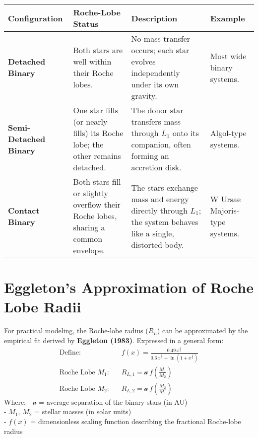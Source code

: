 \documentclass[
  letterpaper,
]{book}
\begin{document}
\begin{longtable}[]{@{}
  >{\raggedright\arraybackslash}p{}
  >{\raggedright\arraybackslash}p{}
  >{\raggedright\arraybackslash}p{}
  >{\raggedright\arraybackslash}p{}@{}}
\toprule\noalign{}
\begin{minipage}[b]{\linewidth}\raggedright
Configuration
\end{minipage} & \begin{minipage}[b]{\linewidth}\raggedright
Roche-Lobe Status
\end{minipage} & \begin{minipage}[b]{\linewidth}\raggedright
Description
\end{minipage} & \begin{minipage}[b]{\linewidth}\raggedright
Example
\end{minipage} \\
\midrule\noalign{}
\endhead
\bottomrule\noalign{}
\endlastfoot
\textbf{Detached Binary} & Both stars are well within their Roche lobes.
& No mass transfer occurs; each star evolves independently under its own
gravity. & Most wide binary systems. \\
\textbf{Semi-Detached Binary} & One star fills (or nearly fills) its
Roche lobe; the other remains detached. & The donor star transfers mass
through \(L_1\) onto its companion, often forming an accretion disk. &
Algol-type systems. \\
\textbf{Contact Binary} & Both stars fill or slightly overflow their
Roche lobes, sharing a common envelope. & The stars exchange mass and
energy directly through \(L_1\); the system behaves like a single,
distorted body. & W Ursae Majoris-type systems. \\
\end{longtable}

\section{Eggleton's Approximation of Roche Lobe
Radii}\label{eggletons-approximation-of-roche-lobe-radii}

For practical modeling, the Roche-lobe radius (\(R_L\)) can be
approximated by the empirical fit derived by \textbf{Eggleton (1983)}.
Expressed in a general form: \[
\begin{align}
\text{Define: }&\quad
f(x) =
\frac{0.49\,x^{\tfrac{2}{3}}}
     {0.6\,x^{\tfrac{2}{3}} +
         \ln\!\left(1 + x^{\tfrac{1}{3}}\right)
     } \\[1em]
\text{Roche Lobe $M_1$:}&\quad R_{L,1} = \mathcal{a}\,
    f\!\left(\frac{M_1}{M_2}\right) \\[1em]
\text{Roche Lobe $M_2$:}&\quad R_{L,2} = \mathcal{a}\,
    f\!\left(\frac{M_2}{M_1}\right)
\end{align}
\] Where: - \(\mathcal{a}\) = average separation of the binary stars (in
AU)\\
- \(M_1,\,M_2\) = stellar masses (in solar units)\\
- \(f(x)\) = dimensionless scaling function describing the fractional
Roche-lobe radius
\end{document}

